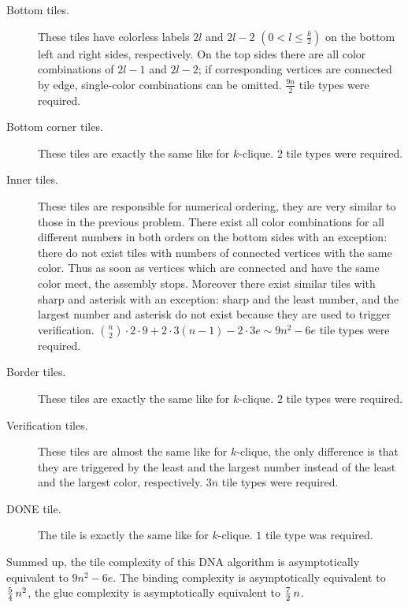 \begin{description}
	\item[Bottom tiles.] These tiles have colorless labels $2l$ and $2l-2$ $(0 < l \leq \frac{k}{2})$ on the bottom left and right sides, respectively. On the top sides there are all color combinations of $2l-1$ and $2l-2$; if corresponding vertices are connected by edge, single-color combinations can be omitted. $\frac{9n}{2}$ tile types were required.
	\item[Bottom corner tiles.] These tiles are exactly the same like for $k$-clique. $2$ tile types were required.
	\item[Inner tiles.] These tiles are responsible for numerical ordering, they are very similar to those in the previous problem. There exist all color combinations for all different numbers in both orders on the bottom sides with an exception: there do not exist tiles with numbers of connected vertices with the same color. Thus as soon as vertices which are connected and have the same color meet, the assembly stops. Moreover there exist similar tiles with sharp and asterisk with an exception: sharp and the least number, and the largest number and asterisk do not exist because they are used to trigger verification. $\binom{n}{2} \cdot 2 \cdot 9 + 2 \cdot 3 (n-1) - 2 \cdot 3 e \sim 9n^2 - 6e$ tile types were required.
	\item[Border tiles.] These tiles are exactly the same like for $k$-clique. $2$ tile types were required.
	\item[Verification tiles.] These tiles are almost the same like for $k$-clique, the only difference is that they are triggered by the least and the largest number instead of the least and the largest color, respectively. $3n$ tile types were required.
	\item[DONE tile.] The tile is exactly the same like for $k$-clique. $1$ tile type was required.
\end{description}

Summed up, the tile complexity of this DNA algorithm is asymptotically equivalent to $9n^2 - 6e$. The binding complexity is asymptotically equivalent to $\nicefrac{5}{4}\,n^2$, the glue complexity is asymptotically equivalent to $\nicefrac{7}{2}\,n$.

